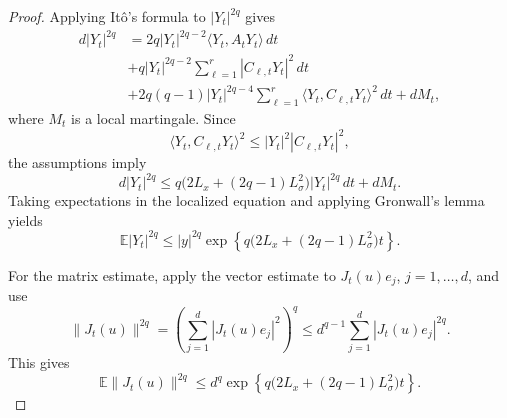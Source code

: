 \documentclass{tsp-short}
\theoremstyle{remark}
\theoremstyle{definition}
\newcommand{\E}{\mathbb E} %
\begin{document}
\begin{proof}
	Applying It\^o's formula to \(|Y_t|^{2q}\) gives
	\begin{align*}
		d|Y_t|^{2q} & = 2q|Y_t|^{2q-2}\langle Y_t,A_tY_t\rangle\,dt                                         \\
		            & + q|Y_t|^{2q-2} \sum_{\ell=1}^{r}|C_{\ell,t}Y_t|^2\,dt                                \\
		            & + 2q(q-1)|Y_t|^{2q-4} \sum_{\ell=1}^{r} \langle Y_t,C_{\ell,t}Y_t\rangle^2\,dt +dM_t,
	\end{align*}
	where \(M_t\) is a local martingale. Since
	\begin{equation*}
		\langle Y_t,C_{\ell,t}Y_t\rangle^2 \le |Y_t|^2|C_{\ell,t}Y_t|^2,
	\end{equation*}
	the assumptions imply
	\begin{equation*}
		d|Y_t|^{2q} \le q\bigl(2L_x+(2q-1)L_\sigma^2\bigr) |Y_t|^{2q}\,dt+dM_t.
	\end{equation*}
	Taking expectations in the localized equation and applying Gronwall's
	lemma yields
	\begin{equation*}
		\E|Y_t|^{2q} \le |y|^{2q} \exp\left\{ q\bigl(2L_x+(2q-1)L_\sigma^2\bigr)t \right\}.
	\end{equation*}

	For the matrix estimate, apply the vector estimate to \(J_t(u)e_j\), \(j=1,\dots,d\), and use
	\begin{equation*}
		\|J_t(u)\|^{2q} = \left(\sum_{j=1}^{d}|J_t(u)e_j|^2\right)^q \le d^{q-1}\sum_{j=1}^{d}|J_t(u)e_j|^{2q}.
	\end{equation*}
	This gives
	\begin{equation*}
		\E\|J_t(u)\|^{2q} \le d^q \exp\left\{ q\bigl(2L_x+(2q-1)L_\sigma^2\bigr)t\right\}.
	\end{equation*}
\end{proof}

\end{document}
